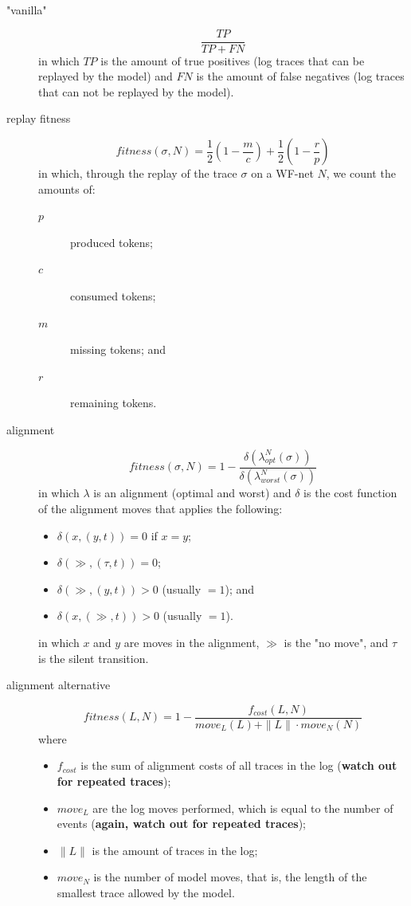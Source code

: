 \documentclass[a4paper]{report}
\begin{document}
\begin{description}
    \item["vanilla"] \[
    \frac{TP}{TP + FN}
\] in which $TP$ is the amount of true positives (log traces that can be replayed by the model) and $FN$ is the amount of false negatives (log traces that can not be replayed by the model).
    \item[replay fitness]  \[
	    fitness(\sigma, N)=\frac{1}{2}\left( 1 - \frac{m}{c} \right) +\frac{1}{2}\left( 1-\frac{r}{p} \right) 
    \] in which, through the replay of the trace $\sigma$ on a WF-net $N$, we count the amounts of:
    \begin{description}
        \item[$p$] produced tokens;
	\item[$c$] consumed tokens;
	\item[$m$] missing tokens; and
	\item[$r$] remaining tokens.
    \end{description}
\item[alignment] \[
	fitness(\sigma, N) = 1 - \frac{\delta \left( \lambda^{N}_{opt}(\sigma) \right) }{\delta \left( \lambda^{N}_{worst}(\sigma) \right)}
    \] in which $\lambda$ is an alignment (optimal and worst) and $\delta$ is the cost function of the alignment moves that applies the following:
    \begin{itemize}
	\item $\delta\left( x, (y,t) \right) = 0 $ if $x = y$;
	\item $\delta\left( \gg, (\tau,t) \right) = 0$;
	\item $\delta\left( \gg, (y,t) \right) > 0$ (usually $=1$); and
	\item $\delta\left( x, (\gg,t) \right) > 0$ (usually $=1$).
    \end{itemize}
    in which $x$ and $y$ are moves in the alignment, $\gg$ is the "no move", and $\tau$ is the silent transition.
\item[alignment alternative] \[
	fitness(L,N) = 1 - \frac{f_{cost}(L,N)}{move_L(L) + \|L\|\cdot move_N(N)}
    \] where 
    \begin{itemize}
        \item $f_{cost}$ is the sum of alignment costs of all traces in the log (\textbf{watch out for repeated traces});
	\item $move_L$ are the log moves performed, which is equal to the number of events (\textbf{again, watch out for repeated traces});
	\item $\|L\|$ is the amount of traces in the log;
	\item $move_N$ is the number of model moves, that is, the length of the smallest trace allowed by the model.
    \end{itemize}
\end{description}
\end{document}
